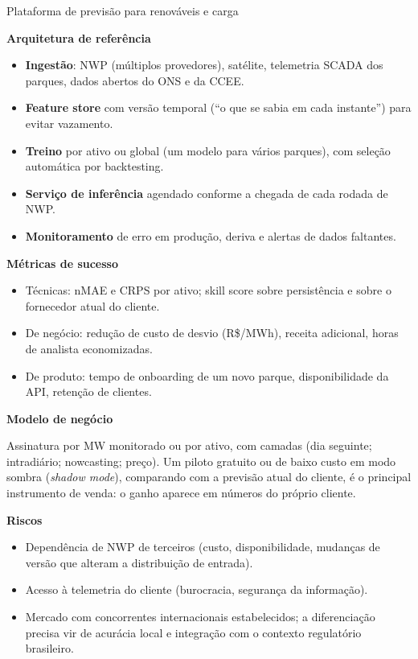 \documentclass[10pt,a4paper,oneside]{article}
\newcommand{\prodsec}[1]{\par\medskip\noindent\textbf{\color{prodcolor}#1}\par\smallskip}
\begin{document}
\begin{produto}{Plataforma de previsão para renováveis e carga}
\prodsec{Arquitetura de referência}
\begin{itemize}
  \item \textbf{Ingestão}: NWP (múltiplos provedores), satélite, telemetria
    SCADA dos parques, dados abertos do ONS e da CCEE.
  \item \textbf{Feature store} com versão temporal (``o que se sabia em cada
    instante'') para evitar vazamento.
  \item \textbf{Treino} por ativo ou global (um modelo para vários parques),
    com seleção automática por backtesting.
  \item \textbf{Serviço de inferência} agendado conforme a chegada de cada
    rodada de NWP.
  \item \textbf{Monitoramento} de erro em produção, deriva e alertas de dados
    faltantes.
\end{itemize}

\prodsec{Métricas de sucesso}
\begin{itemize}
  \item Técnicas: nMAE e CRPS por ativo; skill score sobre persistência e
    sobre o fornecedor atual do cliente.
  \item De negócio: redução de custo de desvio (R\$/MWh), receita
    adicional, horas de analista economizadas.
  \item De produto: tempo de onboarding de um novo parque, disponibilidade da
    API, retenção de clientes.
\end{itemize}

\prodsec{Modelo de negócio}
Assinatura por MW monitorado ou por ativo, com camadas (dia seguinte;
intradiário; nowcasting; preço). Um piloto gratuito ou de baixo custo em
modo sombra (\textit{shadow mode}), comparando com a previsão atual do cliente,
é o principal instrumento de venda: o ganho aparece em números do próprio
cliente.

\prodsec{Riscos}
\begin{itemize}
  \item Dependência de NWP de terceiros (custo, disponibilidade, mudanças de
    versão que alteram a distribuição de entrada).
  \item Acesso à telemetria do cliente (burocracia, segurança da informação).
  \item Mercado com concorrentes internacionais estabelecidos; a
    diferenciação precisa vir de acurácia local e integração com o contexto
    regulatório brasileiro.
\end{itemize}
\end{produto}
\end{document}
